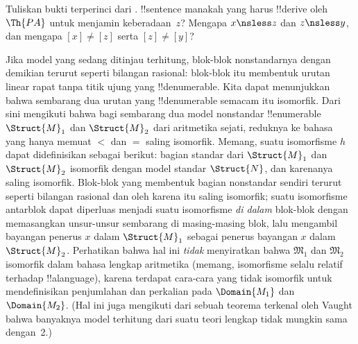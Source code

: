 \documentclass[../../../include/open-logic-section]{subfiles}
\begin{document}
\begin{prob}
Tuliskan bukti terperinci dari
. !!{sentence} manakah yang harus
!!{derive} oleh $\Th{PA}$ untuk menjamin keberadaan~$z$? Mengapa
$x \nsless z$ dan $z \nsless y$, dan mengapa $[x] \neq [z]$ serta
$[z] \neq [y]$?
\end{prob}

\begin{explain}
Jika model yang sedang ditinjau terhitung, blok-blok nonstandarnya dengan
demikian terurut seperti bilangan rasional: blok-blok itu membentuk urutan linear rapat tanpa
titik ujung yang !!{denumerable}. Kita dapat menunjukkan bahwa sembarang dua
urutan yang !!{denumerable} semacam itu isomorfik. Dari sini mengikuti bahwa
bagi sembarang dua model nonstandar !!{enumerable} $\Struct{M}_1$ dan
$\Struct{M}_2$ dari aritmetika sejati, reduknya ke bahasa yang hanya memuat
$<$ dan $=$ saling isomorfik. Memang, suatu isomorfisme $h$ dapat didefinisikan
sebagai berikut: bagian standar dari $\Struct{M}_1$ dan $\Struct{M}_2$
isomorfik dengan model standar $\Struct{N}$, dan karenanya saling isomorfik.
Blok-blok yang membentuk bagian nonstandar sendiri terurut seperti bilangan
rasional dan oleh karena itu saling isomorfik; suatu isomorfisme antarblok
dapat diperluas menjadi suatu isomorfisme \emph{di dalam} blok-blok dengan
memasangkan unsur-unsur sembarang di masing-masing blok, lalu mengambil
bayangan penerus $x$ dalam $\Struct{M}_1$ sebagai penerus bayangan $x$ dalam
$\Struct{M}_2$. Perhatikan bahwa hal ini \emph{tidak} menyiratkan bahwa
$\mathfrak{M}_1$ dan $\mathfrak{M}_2$ isomorfik dalam bahasa lengkap
aritmetika (memang, isomorfisme selalu relatif terhadap !!a{language}), karena
terdapat cara-cara yang tidak isomorfik untuk mendefinisikan penjumlahan dan
perkalian pada $\Domain{M_1}$ dan $\Domain{M_2}$. (Hal ini juga mengikuti dari
sebuah teorema terkenal oleh Vaught bahwa banyaknya model terhitung dari suatu
teori lengkap tidak mungkin sama dengan~2.)
\end{explain}
\end{document}
